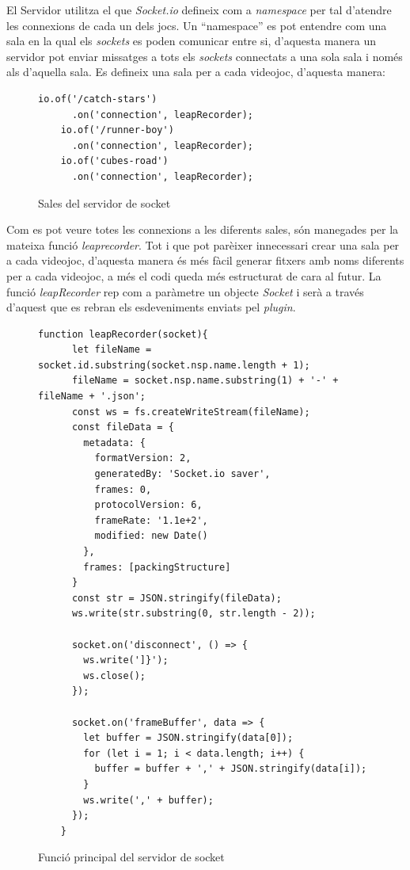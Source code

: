 \documentclass[12pt,a4paper,catalan]{article}
\begin{document}
	El Servidor utilitza el que \textit{Socket.io} defineix com a \textit{namespace} per tal d'atendre les connexions de cada un dels jocs. Un “namespace” es pot entendre com una sala en la qual els \textit{sockets} es poden comunicar entre si, d'aquesta manera un servidor pot enviar missatges a tots els \textit{sockets} connectats a una sola sala i només als d'aquella sala.
	Es defineix una sala per a cada videojoc, d'aquesta manera:
	\begin{figure}[H]
	\begin{lstlisting}[]
	io.of('/catch-stars')
	  .on('connection', leapRecorder);
	io.of('/runner-boy')
	  .on('connection', leapRecorder);
	io.of('cubes-road')
	  .on('connection', leapRecorder);
	\end{lstlisting}
		\caption{Sales del servidor de socket}
		\label{fig:socket-namespaces}
	\end{figure}
	Com es pot veure totes les connexions a les diferents sales, són manegades per la mateixa funció \textit{leaprecorder}. Tot i que pot parèixer innecessari crear una sala per a cada videojoc, d'aquesta manera és més fàcil generar fitxers amb noms diferents per a cada videojoc, a més el codi queda més estructurat de cara al futur.
	La funció \textit{leapRecorder} rep com a paràmetre un objecte \textit{Socket} i serà a través d'aquest que es rebran els esdeveniments enviats pel \textit{plugin}.
	\begin{figure}[H]
	\begin{lstlisting}[]
	function leapRecorder(socket){
	  let fileName = socket.id.substring(socket.nsp.name.length + 1);
	  fileName = socket.nsp.name.substring(1) + '-' + fileName + '.json';
	  const ws = fs.createWriteStream(fileName);
	  const fileData = {
	    metadata: {
	      formatVersion: 2,
	      generatedBy: 'Socket.io saver',
	      frames: 0,
	      protocolVersion: 6,
	      frameRate: '1.1e+2',
	      modified: new Date()
	    },
	    frames: [packingStructure]
	  }
	  const str = JSON.stringify(fileData);
	  ws.write(str.substring(0, str.length - 2));
	
	  socket.on('disconnect', () => {
	    ws.write(']}');
	    ws.close();
	  });
	
	  socket.on('frameBuffer', data => {
	    let buffer = JSON.stringify(data[0]);
	    for (let i = 1; i < data.length; i++) {
	      buffer = buffer + ',' + JSON.stringify(data[i]);
	    }
	    ws.write(',' + buffer);
	  });
	}
	\end{lstlisting}
		\caption{Funció principal del servidor de socket}
		\label{fig:leap-recorder}
	\end{figure}
\end{document}
